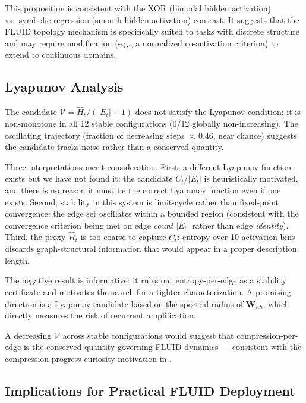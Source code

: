 \documentclass[12pt]{article}
\begin{document}
This proposition is consistent with the XOR (bimodal hidden activation) vs.\ symbolic regression (smooth hidden activation) contrast. It suggests that the FLUID topology mechanism is specifically suited to tasks with discrete structure and may require modification (e.g., a normalized co-activation criterion) to extend to continuous domains.

\subsection{Lyapunov Analysis}

The candidate $\mathcal{V} = \hat{H}_t / (|E_t|+1)$ does not satisfy the Lyapunov condition: it is non-monotone in all 12 stable configurations (0/12 globally non-increasing). The oscillating trajectory (fraction of decreasing steps $\approx 0.46$, near chance) suggests the candidate tracks noise rather than a conserved quantity.

Three interpretations merit consideration. First, a different Lyapunov function exists but we have not found it: the candidate $C_t/|E_t|$ is heuristically motivated, and there is no reason it must be the correct Lyapunov function even if one exists. Second, stability in this system is limit-cycle rather than fixed-point convergence: the edge set oscillates within a bounded region (consistent with the convergence criterion being met on edge \emph{count} $|E_t|$ rather than edge \emph{identity}). Third, the proxy $\hat{H}_t$ is too coarse to capture $C_t$: entropy over 10 activation bins discards graph-structural information that would appear in a proper description length.

The negative result is informative: it rules out entropy-per-edge as a stability certificate and motivates the search for a tighter characterization. A promising direction is a Lyapunov candidate based on the spectral radius of $\mathbf{W}_{hh}$, which directly measures the risk of recurrent amplification.

A decreasing $\mathcal{V}$ across stable configurations would suggest that compression-per-edge is the conserved quantity governing FLUID dynamics --- consistent with the compression-progress curiosity motivation in \cite{lin2026fluid}.

\subsection{Implications for Practical FLUID Deployment}
\end{document}
